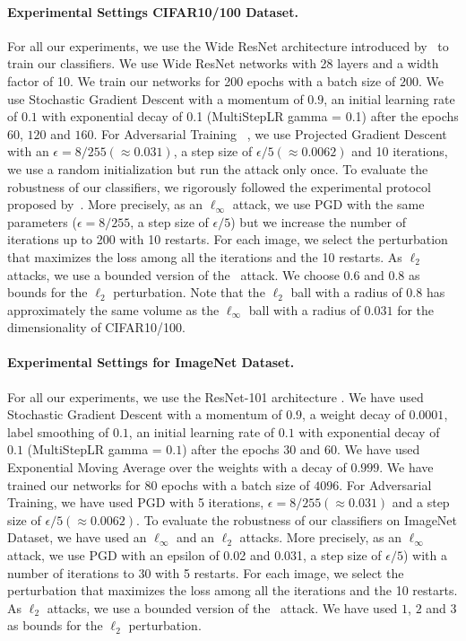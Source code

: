 \paragraph{Experimental Settings CIFAR10/100 Dataset.}
For all our experiments, we use the Wide ResNet architecture introduced by~\citet{zagoruyko2016wide} to train our classifiers.
We use Wide ResNet networks with 28 layers and a width factor of 10.
We train our networks for 200 epochs with a batch size of $200$.
We use Stochastic Gradient Descent with a momentum of $0.9$, an initial learning rate of $0.1$ with exponential decay of 0.1 (MultiStepLR gamma = 0.1) after the epochs $60$, $120$ and $160$.
For Adversarial Training ~\cite{madry2018towards}, we use Projected Gradient Descent with an $\epsilon = 8/255 (\approx 0.031)$, a step size of $\epsilon/5 (\approx 0.0062)$ and 10 iterations, we use a random initialization but run the attack only once.
To evaluate the robustness of our classifiers, we rigorously followed the experimental protocol proposed by~\citet{carlini2019evaluating,tramer2020adaptive}.
More precisely, as an $\ell_\infty$ attack, we use PGD with the same parameters ($\epsilon = 8/255$, a step size of $\epsilon/5$) but we increase the number of iterations up to 200 with 10 restarts.
For each image, we select the perturbation that maximizes the loss among all the iterations and the 10 restarts.
As $\ell_2$ attacks, we use a bounded version of the~\citet{carlini2017towards} attack.
We choose $0.6$ and $0.8$ as bounds for the $\ell_2$ perturbation.
Note that the $\ell_2$ ball with a radius of $0.8$ has approximately the same volume as the $\ell_\infty$ ball with a radius of $0.031$ for the dimensionality of CIFAR10/100.


\paragraph{Experimental Settings for ImageNet Dataset.}
For all our experiments, we use the ResNet-101 architecture \cite{he2016deep}.
We have used Stochastic Gradient Descent with a momentum of $0.9$, a weight decay of $0.0001$, label smoothing of $0.1$, an initial learning rate of $0.1$ with exponential decay of $0.1$ (MultiStepLR gamma = $0.1$) after the epochs $30$ and $60$.
We have used Exponential Moving Average over the weights with a decay of $0.999$.
We have trained our networks for 80 epochs with a batch size of $4096$.
For Adversarial Training, we have used PGD with 5 iterations, $\epsilon = 8/255 (\approx 0.031)$ and a step size of $\epsilon/5 (\approx 0.0062)$.
To evaluate the robustness of our classifiers on ImageNet Dataset, we have used an $\ell_\infty$ and an $\ell_2$ attacks.
More precisely, as an $\ell_\infty$ attack, we use PGD with an epsilon of 0.02 and 0.031, a step size of $\epsilon/5$) with a number of iterations to 30 with 5 restarts.
For each image, we select the perturbation that maximizes the loss among all the iterations and the 10 restarts.
As $\ell_2$ attacks, we use a bounded version of the~\citet{carlini2017towards} attack.
We have used $1$, $2$ and $3$ as bounds for the $\ell_2$ perturbation.


